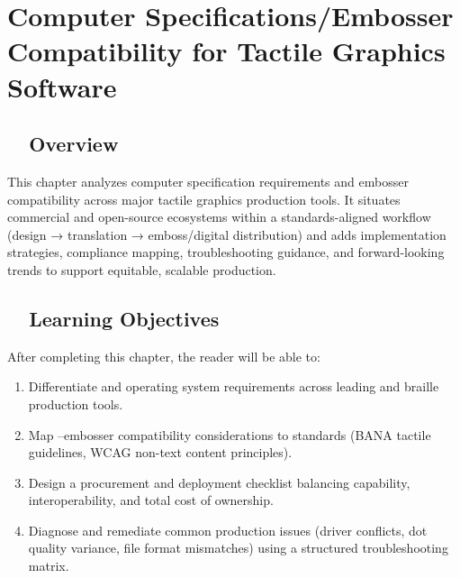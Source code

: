 \chapter{Computer Specifications/Embosser Compatibility for Tactile Graphics Software}\label{ch14:tactile-graphics-specs}
\raggedright
\section{~~Overview}\label{ch14:sec:overview}
This chapter analyzes computer specification requirements and embosser compatibility across major tactile graphics production tools. It situates commercial and open-source ecosystems within a standards-aligned workflow (design → translation → emboss/digital distribution) and adds implementation strategies, compliance mapping, troubleshooting guidance, and forward-looking trends to support equitable, scalable production.

\section{~~Learning Objectives}\label{ch14:sec:learning-objectives}
After completing this chapter, the reader will be able to:
\begin{enumerate}
	\item Differentiate  and operating system requirements across leading  and braille production tools.
	\item Map –embosser compatibility considerations to standards (BANA tactile guidelines, WCAG non-text content principles).
	\item Design a procurement and deployment checklist balancing capability, interoperability, and total cost of ownership.
	\item Diagnose and remediate common production issues (driver conflicts, dot quality variance, file format mismatches) using a structured troubleshooting matrix.
\end{enumerate}

